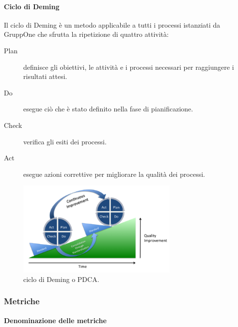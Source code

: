 \documentclass[../../norme-di-progetto.tex]{subfiles}
\begin{document}
\paragraph{Ciclo di Deming}%
\label{par:ciclo_di_deming}

Il ciclo di Deming è un metodo applicabile a tutti i processi istanziati da GruppOne che sfrutta la ripetizione di quattro attività:

\begin{description}
  \item [Plan] definisce gli obiettivi, le attività e i processi necessari per raggiungere i risultati attesi.
  \item [Do] esegue ciò che è stato definito nella fase di pianificazione.
  \item [Check] verifica gli esiti dei processi.
  \item [Act] esegue azioni correttive per migliorare la qualità dei processi.
\end{description}

\begin{figure}[H]
  \includegraphics[width=8cm]{PDCA-process.png}
  \centering
  \caption{ciclo di Deming o PDCA.}
\end{figure}

\subsubsection{Metriche}%
\label{subs:accertamento_della_qualita/metriche}

\paragraph{Denominazione delle metriche}%
\label{par:denominazione_delle_metriche}
\end{document}

